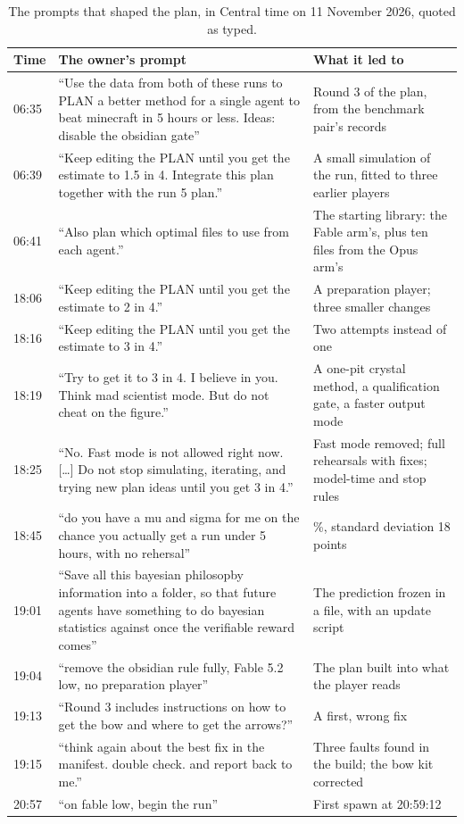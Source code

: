 \documentclass[11pt,a4paper]{article}
\begin{document}
\begin{table}[H]
\caption{The prompts that shaped the plan, in Central time on 11 November 2026, quoted as typed.}
\label{tab:prompts}
\small
\begin{tabularx}{\textwidth}{@{}l>{\raggedright\arraybackslash}X>{\raggedright\arraybackslash}X@{}}
\toprule
Time & The owner's prompt & What it led to \\
\midrule
06:35 & ``Use the data from both of these runs to PLAN a better method for a single agent to beat minecraft in 5 hours or less. Ideas: disable the obsidian gate'' & Round 3 of the plan, from the benchmark pair's records \\
06:39 & ``Keep editing the PLAN until you get the estimate to 1.5 in 4. Integrate this plan together with the run 5 plan.'' & A small simulation of the run, fitted to three earlier players \\
06:41 & ``Also plan which optimal files to use from each agent.'' & The starting library: the Fable arm's, plus ten files from the Opus arm's \\
18:06 & ``Keep editing the PLAN until you get the estimate to 2 in 4.'' & A preparation player; three smaller changes \\
18:16 & ``Keep editing the PLAN until you get the estimate to 3 in 4.'' & Two attempts instead of one \\
18:19 & ``Try to get it to 3 in 4. I believe in you. Think mad scientist mode. But do not cheat on the figure.'' & A one-pit crystal method, a qualification gate, a faster output mode \\
18:25 & ``No. Fast mode is not allowed right now. [\ldots] Do not stop simulating, iterating, and trying new plan ideas until you get 3 in 4.'' & Fast mode removed; full rehearsals with fixes; model-time and stop rules \\
18:45 & ``do you have a mu and sigma for me on the chance you actually get a run under 5 hours, with no rehersal'' & 50\%, standard deviation 18 points \\
19:01 & ``Save all this bayesian philosopby information into a folder, so that future agents have something to do bayesian statistics against once the verifiable reward comes'' & The prediction frozen in a file, with an update script \\
19:04 & ``remove the obsidian rule fully, Fable 5.2 low, no preparation player'' & The plan built into what the player reads \\
19:13 & ``Round 3 includes instructions on how to get the bow and where to get the arrows?'' & A first, wrong fix \\
19:15 & ``think again about the best fix in the manifest. double check. and report back to me.'' & Three faults found in the build; the bow kit corrected \\
20:57 & ``on fable low, begin the run'' & First spawn at 20:59:12 \\
\bottomrule
\end{tabularx}
\end{table}
\end{document}
